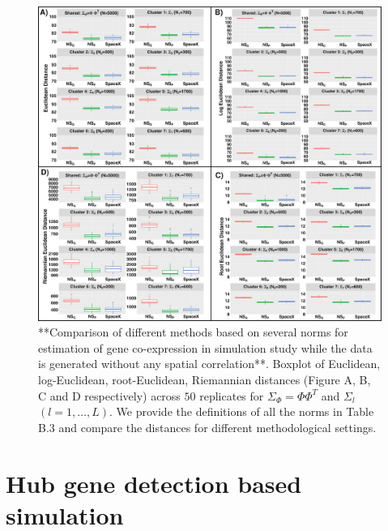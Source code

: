 \documentclass[
]{book}
\begin{document}
\begin{figure}

{\centering \includegraphics[width=41.67in]{images/Null_sim_norm} 

}

\caption{ **Comparison of different methods based on several norms for estimation of gene co-expression in simulation study while the data is generated without any spatial correlation**. Boxplot of Euclidean, log-Euclidean, root-Euclidean, Riemannian distances (Figure A, B, C and D respectively) across  $50$ replicates for $\Sigma_{\Phi} = \Phi \Phi^{T}$ and $\Sigma_{l}$ $(l = 1, \dots , L)$. We provide the definitions of all the norms in Table B.3 and compare the distances for different methodological settings.}\label{fig:nullsimulationnorm}
\end{figure}

\hypertarget{hub-gene-detection-based-simulation}{%
\section{Hub gene detection based simulation}\label{hub-gene-detection-based-simulation}}
\end{document}

